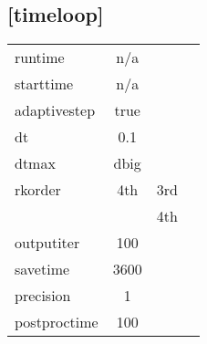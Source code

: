 \documentclass[a4paper,10pt]{extarticle}
\begin{document}
\subsection*{[timeloop]}
\tablelasttail{\hline}
\begin{supertabular}{lccl}
runtime       & n/a   & \\
starttime     & n/a   & \\
adaptivestep  & true  & \\
dt            & 0.1   & \\
dtmax         & dbig  & \\
rkorder       & 4th   & 3rd \\
              &       & 4th \\
outputiter    & 100   & \\
savetime      & 3600  & \\
precision     & 1     & \\
postproctime  & 100   & \\
\end{supertabular}
\end{document}
